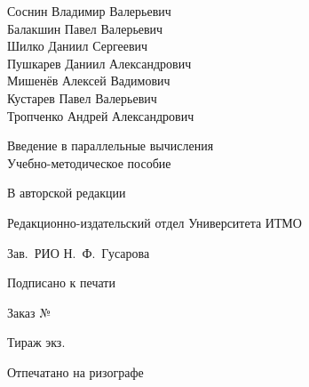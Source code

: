 \thispagestyle{empty}

\vspace*{\fill}

\begin{center}
    Соснин Владимир Валерьевич \\
    Балакшин Павел Валерьевич \\
    Шилко Даниил Сергеевич \\
    Пушкарев Даниил Александрович \\
    Мишенёв Алексей Вадимович \\
    Кустарев Павел Валерьевич \\
    Тропченко Андрей Александрович
\\[2\baselineskip]
\begin{bfseries}
    {\large Введение в параллельные вычисления}
    \\[\baselineskip]
    Учебно-методическое пособие
\end{bfseries}

\end{center}

\vspace*{\fill}

\noindent
В авторской редакции

\noindent
Редакционно-издательский отдел Университета ИТМО

\noindent
Зав.\ РИО \hfill Н.\ Ф.\ Гусарова

\noindent
Подписано к печати

\noindent
Заказ №

\noindent
Тираж \qquad \quad экз.

\noindent
Отпечатано на ризографе